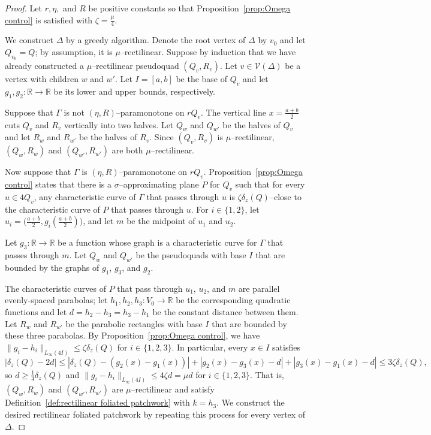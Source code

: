 \documentclass[11pt,reqno]{amsart}
\newcommand{\R}{\mathbb{R}}
\newcommand{\cV}{\mathcal{V}}
\newcommand{\0}{\mathbf{0}}
\renewcommand{\1}{\mathbf 1}
\newcommand{\from}{\colon}
\renewcommand{\ge}{\geqslant}
\renewcommand{\le}{\leqslant}
\theoremstyle{remark}
\begin{document}
\begin{proof}
  Let $r, \eta,$ and $R$ be positive constants so that Proposition~\ref{prop:Omega control} is satisfied with $\zeta=\frac{\mu}{4}$.

  We construct $\Delta$ by a greedy algorithm.  Denote the root vertex of $\Delta$ by $v_0$ and let $Q_{v_0}=Q$; by assumption, it is $\mu$--rectilinear.  Suppose by induction that we have already constructed a $\mu$--rectilinear pseudoquad $(Q_v,R_v)$.  Let $v\in \cV(\Delta)$ be a vertex with children $w$ and $w'$.  Let $I=[a,b]$ be the base of $Q_v$ and let $g_1,g_2\from \R \to \R$ be its lower and upper bounds, respectively.

  Suppose that $\Gamma$ is not $(\eta,R)$--paramonotone on $rQ_v$.  The vertical line $x=\frac{a+b}{2}$ cuts $Q_v$ and $R_v$ vertically into two halves.  Let $Q_w$ and $Q_{w'}$ be the halves of $Q_v$ and let $R_w$ and $R_{w'}$ be the halves of $R_v$.  Since $(Q_v,R_v)$ is $\mu$--rectilinear, $(Q_w,R_w)$ and $(Q_{w'},R_{w'})$ are both $\mu$--rectilinear.

  Now suppose that $\Gamma$ is $(\eta,R)$--paramonotone on $rQ_v$.    Proposition~\ref{prop:Omega control} states that there is a $\sigma$--approximating plane $P$ for $Q_v$ such that for every $u\in 4Q_v$, any characteristic curve of $\Gamma$ that passes through $u$ is $\zeta \delta_z(Q)$--close to the characteristic curve of $P$ that passes through $u$.  For $i\in \{1,2\}$, let $u_i=\bigl(\frac{a+b}{2}, g_i(\frac{a+b}{2})\bigr)$, and let $m$ be the midpoint of $u_1$ and $u_2$.

  Let $g_3\from \R\to \R$ be a function whose graph is a characteristic curve for $\Gamma$ that passes through $m$.  Let $Q_w$ and $Q_{w'}$ be the pseudoquads with base $I$ that are bounded by the graphs of $g_1$, $g_3$, and $g_2$.

  The characteristic curves of $P$ that pass through $u_1$, $u_2$, and $m$ are parallel evenly-spaced parabolas; let $h_1,h_2,h_3\from V_0\to \R$ be the corresponding quadratic functions and let $d=h_2-h_3=h_3-h_1$ be the constant distance between them.  Let $R_w$ and $R_{w'}$ be the parabolic rectangles with base $I$ that are bounded by these three parabolas.  By Proposition~\ref{prop:Omega control}, we have $\|g_i-h_i\|_{L_\infty(4I)}\le \zeta \delta_z(Q)$ for $i\in \{1,2,3\}$.  In particular, every $x\in I$ satisfies
  $$|\delta_z(Q)-2d|\le |\delta_z(Q)-(g_2(x)-g_1(x))| + |g_2(x)-g_3(x) - d| + |g_3(x)-g_1(x) - d| \le 3\zeta \delta_z(Q),$$
  so $d\ge \frac{1}{4} \delta_z(Q)$ and $\|g_i-h_i\|_{L_\infty(4I)}\le  4\zeta d=\mu d$ for $i\in \{1,2,3\}$.  That is, $(Q_w,R_w)$ and $(Q_{w'},R_{w'})$ are $\mu$--rectilinear and satisfy Definition~\ref{def:rectilinear foliated patchwork} with $k=h_3$. We construct the desired rectilinear foliated patchwork by repeating this process for every vertex of $\Delta$.
\end{proof}
\end{document}

